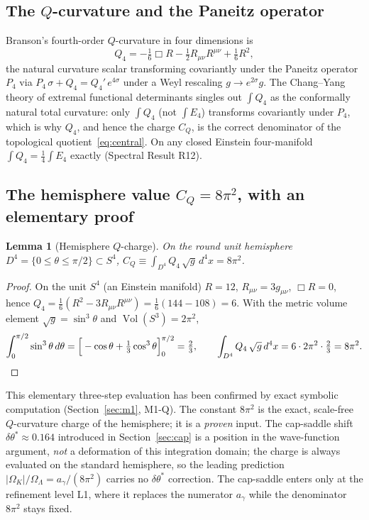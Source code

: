 \documentclass[11pt,a4paper]{article}
\theoremstyle{plain}
\newtheorem{lemma}[theorem]{Lemma}
\theoremstyle{definition}
\theoremstyle{remark}
\newcommand{\Ok}{\Omega_K}
\newcommand{\OL}{\Omega_\Lambda}
\newcommand{\ag}{a_\gamma}
\newcommand{\CQ}{C_Q}
\newcommand{\dtheta}{\delta\theta}
\DeclareMathOperator{\Vol}{Vol}
\begin{document}
\subsection{The $Q$-curvature and the Paneitz operator}
Branson's fourth-order $Q$-curvature in four dimensions is
\begin{equation}
Q_4 = -\tfrac{1}{6}\Box R - \tfrac{1}{2} R_{\mu\nu}R^{\mu\nu} + \tfrac{1}{6} R^2 ,
\end{equation}
the natural curvature scalar transforming covariantly under the Paneitz operator $P_4$ via
$P_4\,\sigma + Q_4 = Q_4'\, e^{4\sigma}$ under a Weyl rescaling $g \to e^{2\sigma} g$. The
Chang--Yang theory of extremal functional determinants \cite{ChangYang1995,Branson1995} singles
out $\int Q_4$ as the conformally natural total curvature: only $\int Q_4$ (not $\int E_4$)
transforms covariantly under $P_4$, which is why $Q_4$, and hence the charge $\CQ$, is the
correct denominator of the topological quotient~\eqref{eq:central}. On any closed Einstein
four-manifold $\int Q_4 = \tfrac14\int E_4$ exactly (Spectral Result R12).

\subsection{The hemisphere value $\CQ = 8\pi^2$, with an elementary proof}
\begin{lemma}[Hemisphere $Q$-charge]
\label{lem:qcharge}
On the round unit hemisphere $D^4 = \{0 \le \theta \le \pi/2\} \subset S^4$,
$\CQ \equiv \int_{D^4} Q_4\,\sqrt{g}\,d^4x = 8\pi^2$.
\end{lemma}
\begin{proof}
On the unit $S^4$ (an Einstein manifold) $R = 12$, $R_{\mu\nu} = 3 g_{\mu\nu}$, $\Box R = 0$,
hence $Q_4 = \tfrac16(R^2 - 3 R_{\mu\nu}R^{\mu\nu}) = \tfrac16(144 - 108) = 6$. With the metric
volume element $\sqrt{g} = \sin^3\theta$ and $\Vol(S^3) = 2\pi^2$,
\[
\int_0^{\pi/2}\sin^3\theta\,d\theta = \Big[-\cos\theta + \tfrac13\cos^3\theta\Big]_0^{\pi/2}
 = \tfrac23,
\qquad
\int_{D^4} Q_4\,\sqrt{g}\,d^4x = 6 \cdot 2\pi^2 \cdot \tfrac23 = 8\pi^2 . \qedhere
\]
\end{proof}
\noindent
This elementary three-step evaluation has been confirmed by exact symbolic computation
(Section~\ref{sec:m1}, M1-Q). The constant $8\pi^2$ is the exact, scale-free $Q$-curvature
charge of the hemisphere; it is a \emph{proven} input. The cap-saddle shift
$\dtheta^* \approx 0.164$ introduced in Section~\ref{sec:cap} is a position in the wave-function
argument, \emph{not} a deformation of this integration domain; the charge is always evaluated
on the standard hemisphere, so the leading prediction $|\Ok|/\OL = \ag/(8\pi^2)$ carries no
$\dtheta^*$ correction. The cap-saddle enters only at the refinement level L1, where it
replaces the numerator $\ag$ while the denominator $8\pi^2$ stays fixed.
\end{document}
